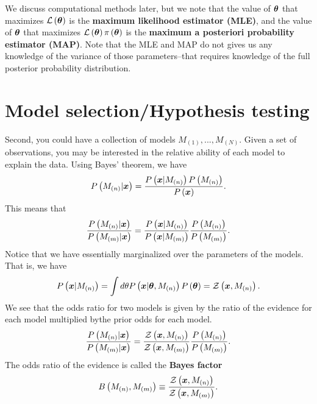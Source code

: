 We discuss computational methods later, but we note that the value of
${\bm \theta}$ that maximizes $\mathcal{L}\left({\bm \theta}\right)$ is
the \textbf{maximum likelihood estimator (MLE)}, and the value of
${\bm \theta}$ that maximizes
$\mathcal{L}\left({\bm \theta}\right)\pi\left({\bm \theta}\right)$
is the \textbf{maximum a posteriori probability estimator (MAP)}.
Note that the MLE and MAP do not gives us any knowledge of the variance
of those parameters--that requires knowledge of the full posterior probability distribution.

\section{Model selection/Hypothesis testing}

Second, you could have a collection of models $M_{(1)},...,M_{(N)}$.
Given a set of observations, you may be interested in the relative ability
of each model to explain the data.
Using Bayes' theorem, we have
\begin{align}
    P\left(M_{(n)}|{\bm x}\right)
    =
    \frac{P\left({\bm x}|M_{(n)}\right)P\left(M_{(n)}\right)}{P\left({\bm x}\right)}
    .
\end{align}
This means that
\begin{align}
    \frac{P\left(M_{(n)}|{\bm x}\right)}{P\left(M_{(m)}|{\bm x}\right)}
    =
    \frac{
        P\left({\bm x}|M_{(n)}\right)
    }{
        P\left({\bm x}|M_{(m)}\right)
    }
    \frac{
        P\left(M_{(n)}\right)
    }{
        P\left(M_{(m)}\right)
    }
    .
\end{align}
Notice that we have essentially marginalized over the parameters of the models.
That is, we have
\begin{align}
    P\left({\bm x}|M_{(n)}\right)
    =
    \int d\theta P\left({\bm x}|{\bm \theta},M_{(n)}\right) P\left({\bm \theta}\right)
    =
    \mathcal{Z}\left({\bm x},M_{(n)}\right)
    .
\end{align}
We see that the odds ratio for two models is given by the ratio of the evidence 
for each model multiplied bythe prior odds for each model.
\begin{align}
    \frac{P\left(M_{(n)}|{\bm x}\right)}{P\left(M_{(m)}|{\bm x}\right)}
    =
    \frac{
        \mathcal{Z}\left({\bm x},M_{(n)}\right) 
    }{
        \mathcal{Z}\left({\bm x},M_{(m)}\right) 
    }
    \frac{
        P\left(M_{(n)}\right)
    }{
        P\left(M_{(m)}\right)
    }
    .
\end{align}
The odds ratio of the evidence is called the \textbf{Bayes factor}
\begin{align}
    \label{eq:bayes-factor}
    B\left(M_{(n)},M_{(m)}\right)
    \equiv
    \frac{
        \mathcal{Z}\left({\bm x},M_{(n)}\right) 
    }{
        \mathcal{Z}\left({\bm x},M_{(m)}\right) 
    }
    .
\end{align}

